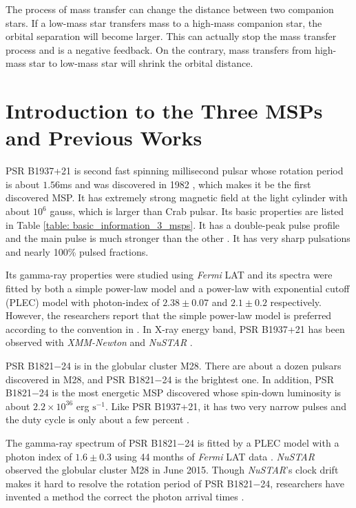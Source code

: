 \documentclass[a4paper, 12pt]{report}
\begin{document}
        The process of mass transfer can change the distance between two 
        companion stars. If a low-mass star transfers mass to a high-mass companion star,
        the orbital separation will become larger. This can actually stop the mass transfer
        process and is a negative feedback. On the contrary, mass transfers from high-mass 
        star to low-mass star will shrink the orbital distance.
                       
    
  \section{Introduction to the Three MSPs and Previous Works}
    PSR B1937+21 is second fast spinning millisecond pulsar whose rotation period 
    is about $1.56$ms and was discovered in 1982 
    \cite{1982Natur.300..615B}, which makes it be the first discovered MSP. It has 
    extremely strong magnetic field at the light cylinder with about $10^6$ gauss, which 
    is larger than Crab pulsar. Its basic properties are listed in Table 
    \ref{table: basic_information_3_msps}. It has a double-peak pulse profile and the main 
    pulse is much stronger than the other \cite{j1939_pulse_profile}. It has very sharp 
    pulsations and nearly 100\% pulsed fractions. 
    
    Its gamma-ray properties were studied using \textit{Fermi} LAT and its 
    spectra were fitted by both a simple power-law model and a power-law with exponential
    cutoff (PLEC) model with photon-index of $2.38\pm0.07$ and $2.1\pm0.2$ respectively. 
    However, the researchers report that the simple power-law model is preferred according 
    to the convention in \cite{0067-0049-208-2-17} \cite{0004-637X-787-2-167}. In X-ray 
    energy band, PSR B1937+21 has been observed with \textit{XMM-Newton} and \textit{NuSTAR} 
    \cite{0004-637X-787-2-167,0004-637X-845-2-159}.
    
    PSR B1821$-$24 is in the globular cluster M28. There 
    are about a dozen pulsars discovered in M28, and PSR B1821$-$24 is the brightest one. 
    In addition, PSR B1821$-$24 is the most energetic MSP discovered whose spin-down
    luminosity is about $2.2\times 10^{36}$ erg $\mbox{s}^{-1}$. Like PSR B1937+21, it has 
    two very narrow pulses and the duty cycle is only about a few percent
    \cite{1538-4357-627-2-L125}.

    The gamma-ray spectrum of PSR B1821$-$24 is fitted by a PLEC model with a photon index of 
    $1.6\pm0.3$ using 44 months of \textit{Fermi} LAT data \cite{2013ApJ...778..106J}.
    \textit{NuSTAR} observed the globular cluster M28 in June 2015. Though \textit{NuSTAR}'s
    clock drift makes it hard to resolve the rotation period of PSR B1821$-$24, 
    researchers have invented a method the correct the photon arrival times
    \cite{0004-637X-845-2-159}.
    
\end{document}
